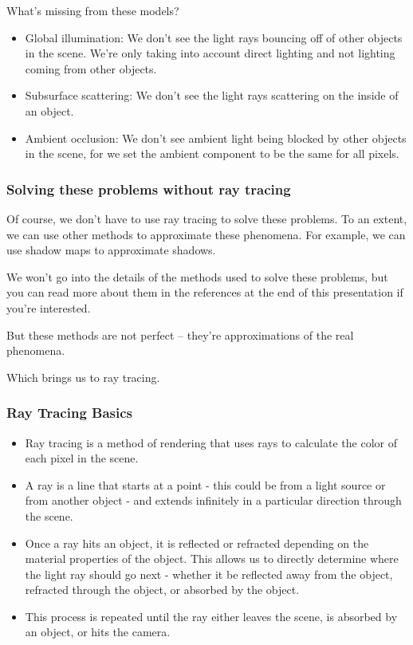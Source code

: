 \documentclass{beamer}
\begin{document}
  \begin{frame}{What's missing from these models?}

    \begin{itemize}
      \item Global illumination: We don't see the light rays bouncing off of other objects in the scene.
      We're only taking into account direct lighting and not lighting coming from other objects.
      \item Subsurface scattering: We don't see the light rays scattering on the inside of an object.
      \item Ambient occlusion: We don't see ambient light being blocked by other objects in the scene, for we set the ambient component to be the same for all pixels.
    \end{itemize}

  \end{frame}

  \begin{frame}
    \frametitle{Solving these problems without ray tracing}

    Of course, we don't have to use ray tracing to solve these problems.
    To an extent, we can use other methods to approximate these phenomena.
    For example, we can use shadow maps to approximate shadows.

    \hfill

    We won't go into the details of the methods used to solve these problems, but you can read more about them in the references at the end of this presentation if you're interested.

    \hfill

    But these methods are not perfect -- they're approximations of the real phenomena.

    \hfill

    Which brings us to ray tracing.

  \end{frame}

  \begin{frame}
    \frametitle{Ray Tracing Basics}
    \begin{itemize}
      \item Ray tracing is a method of rendering that uses rays to calculate the color of each pixel in the scene.
      \item A ray is a line that starts at a point - this could be from a light source or from another object - and extends infinitely in a particular direction through the scene.
      \item Once a ray hits an object, it is reflected or refracted depending on the material properties of the object.
      This allows us to directly determine where the light ray should go next - whether it be reflected away from the object, refracted through the object, or absorbed by the object.
      \item This process is repeated until the ray either leaves the scene, is absorbed by an object, or hits the camera.
    \end{itemize}

  \end{frame}
\end{document}

